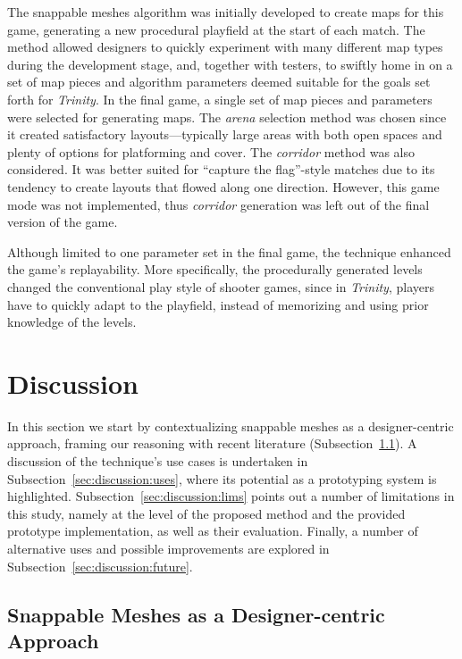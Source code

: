 \documentclass[journal]{IEEEtran}
\begin{document}
The snappable meshes algorithm was initially developed to create maps for this game,
generating a new procedural playfield at the start of each match. The method allowed
designers to quickly experiment with many different map types during the development
stage, and, together with testers, to swiftly home in on
a set of map pieces and algorithm parameters deemed suitable for the goals set forth
for \textit{Trinity}. In the final game, a single set of map pieces and parameters were
selected for generating maps. The \textit{arena} selection method was chosen since it
created satisfactory layouts---typically large areas with both open spaces and plenty of
options for platforming and cover. The \textit{corridor} method was also considered.
It was better suited for ``capture the flag''-style matches due to its tendency to
create layouts that flowed along one direction. However, this game mode was not
implemented, thus \textit{corridor} generation was left out of the final version of the
game.

Although limited to one parameter set in the final game, the technique enhanced the game's
replayability. More specifically, the procedurally generated levels changed the
conventional play style of shooter games, since in \textit{Trinity}, players have to quickly
adapt to the playfield, instead of memorizing and using prior knowledge of the levels.

\section{Discussion}
\label{sec:discussion}

In this section we start by contextualizing snappable meshes as a designer-centric
approach, framing our reasoning with recent literature
(Subsection~\ref{sec:discussion:framing}). A discussion of the technique's use
cases is undertaken in Subsection~\ref{sec:discussion:uses}, where its potential
as a prototyping system is highlighted. Subsection~\ref{sec:discussion:lims}
points out a number of limitations in this study, namely at the level of the
proposed method and the provided prototype implementation, as well as their
evaluation. Finally, a number of alternative uses and possible improvements are
explored in Subsection~\ref{sec:discussion:future}.

\subsection{Snappable Meshes as a Designer-centric Approach}
\label{sec:discussion:framing}
\end{document}

